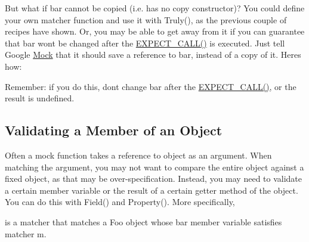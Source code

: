 But what if {\ttfamily bar} cannot be copied (i.\+e. has no copy constructor)? You could define your own matcher function and use it with {\ttfamily Truly()}, as the previous couple of recipes have shown. Or, you may be able to get away from it if you can guarantee that {\ttfamily bar} won\textquotesingle{}t be changed after the {\ttfamily \mbox{\hyperlink{gmock-spec-builders_8h_a535a6156de72c1a2e25a127e38ee5232}{E\+X\+P\+E\+C\+T\+\_\+\+C\+A\+L\+L()}}} is executed. Just tell Google \mbox{\hyperlink{classMock}{Mock}} that it should save a reference to {\ttfamily bar}, instead of a copy of it. Here\textquotesingle{}s how\+:


\begin{DoxyCode}{0}
\DoxyCodeLine{}
\end{DoxyCode}


Remember\+: if you do this, don\textquotesingle{}t change {\ttfamily bar} after the {\ttfamily \mbox{\hyperlink{gmock-spec-builders_8h_a535a6156de72c1a2e25a127e38ee5232}{E\+X\+P\+E\+C\+T\+\_\+\+C\+A\+L\+L()}}}, or the result is undefined.

\subsection*{Validating a Member of an Object}

Often a mock function takes a reference to object as an argument. When matching the argument, you may not want to compare the entire object against a fixed object, as that may be over-\/specification. Instead, you may need to validate a certain member variable or the result of a certain getter method of the object. You can do this with {\ttfamily Field()} and {\ttfamily Property()}. More specifically,


\begin{DoxyCode}{0}
\end{DoxyCode}


is a matcher that matches a {\ttfamily Foo} object whose {\ttfamily bar} member variable satisfies matcher {\ttfamily m}.


\begin{DoxyCode}{0}
\end{DoxyCode}


